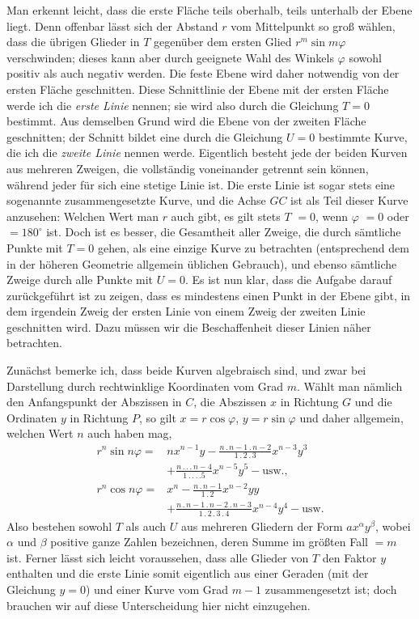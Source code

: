 Man erkennt leicht, dass die erste Fläche teils oberhalb, teils unterhalb der Ebene liegt. Denn offenbar lässt sich der Abstand $r$ vom Mittelpunkt so groß wählen, dass die übrigen Glieder in $T$ gegenüber dem ersten Glied $r^m\sin m\varphi$ verschwinden; dieses kann aber durch geeignete Wahl des Winkels $\varphi$ sowohl positiv als auch negativ werden. Die feste Ebene wird daher notwendig von der ersten Fläche geschnitten. Diese Schnittlinie der Ebene mit der ersten Fläche werde ich die \textit{erste Linie} nennen; sie wird also durch die Gleichung $T=0$ bestimmt. Aus demselben Grund wird die Ebene von der zweiten Fläche geschnitten; der Schnitt bildet eine durch die Gleichung $U=0$ bestimmte Kurve, die ich die \textit{zweite Linie} nennen werde. Eigentlich besteht jede der beiden Kurven aus mehreren Zweigen, die vollständig voneinander getrennt sein können, während jeder für sich eine stetige Linie ist. Die erste Linie ist sogar stets eine sogenannte zusammengesetzte Kurve, und die Achse $GC$ ist als Teil dieser Kurve anzusehen: Welchen Wert man $r$ auch gibt, es gilt stets $T$ $=0$, wenn $\varphi$ $=0$ oder $=180^{\circ}$ ist. Doch ist es besser, die Gesamtheit aller Zweige, die durch sämtliche Punkte mit $T=0$ gehen, als eine einzige Kurve zu betrachten (entsprechend dem in der höheren Geometrie allgemein üblichen Gebrauch), und ebenso sämtliche Zweige durch alle Punkte mit $U=0$. Es ist nun klar, dass die Aufgabe darauf zurückgeführt ist zu zeigen, dass es mindestens einen Punkt in der Ebene gibt, in dem irgendein Zweig der ersten Linie von einem Zweig der zweiten Linie geschnitten wird. Dazu müssen wir die Beschaffenheit dieser Linien näher betrachten.

Zunächst bemerke ich, dass beide Kurven algebraisch sind, und zwar bei Darstellung durch rechtwinklige Koordinaten vom Grad $m$. Wählt man nämlich den Anfangspunkt der Abszissen in $C$, die Abszissen $x$ in Richtung $G$ und die Ordinaten $y$ in Richtung $P$, so gilt $x=r\cos\varphi$, $y=r\sin\varphi$ und daher allgemein, welchen Wert $n$ auch haben mag,
\[
\begin{aligned}
r^n\sin n\varphi={}&nx^{n-1}y-\frac{n\mathbin{.}n-1\mathbin{.}n-2}{1\mathbin{.}2\mathbin{.}3}x^{n-3}y^3\\
&+\frac{n\mathbin{.}\mathbin{.}\mathbin{.}n-4}{1\mathbin{.}\mathbin{.}\mathbin{.}\mathbin{.}5}x^{n-5}y^5-\text{usw.},\\
r^n\cos n\varphi={}&x^n-\frac{n\mathbin{.}n-1}{1\mathbin{.}2}x^{n-2}yy\\
&+\frac{n\mathbin{.}n-1\mathbin{.}n-2\mathbin{.}n-3}{1\mathbin{.}2\mathbin{.}3\mathbin{.}4}x^{n-4}y^4-\text{usw.}
\end{aligned}
\]
Also bestehen sowohl $T$ als auch $U$ aus mehreren Gliedern der Form $ax^{\alpha}y^{\beta}$,
wobei $\alpha$ und $\beta$ positive ganze Zahlen bezeichnen, deren Summe im größten Fall $=m$ ist. Ferner lässt sich leicht voraussehen, dass alle Glieder von $T$ den Faktor $y$ enthalten und die erste Linie somit eigentlich aus einer Geraden (mit der Gleichung $y=0$) und einer Kurve vom Grad $m-1$ zusammengesetzt ist; doch brauchen wir auf diese Unterscheidung hier nicht einzugehen.


